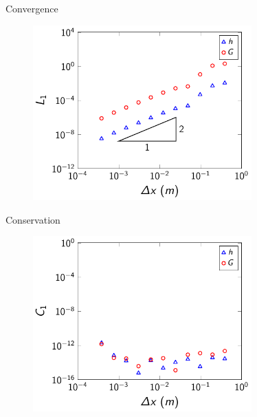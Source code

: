 \documentclass[pdf]{beamer}
\begin{document}
\begin{frame}{Convergence}
		\begin{figure}
			\includegraphics[width=0.75\textwidth]{./Pics/Tex/Soliton/L1/L1.pdf}
		\end{figure}
\end{frame}
\begin{frame}{Conservation}
			\begin{figure}
				\includegraphics[width=0.75\textwidth]{./Pics/Tex/Soliton/C1/C1.pdf}
			\end{figure}
\end{frame}
\end{document}
